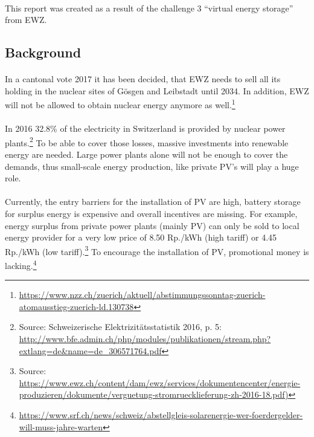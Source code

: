 \documentclass{scrartcl}
\begin{document}
	\paragraph{}
	This report was created as a result of the challenge 3 “virtual energy storage” from EWZ.
	
	\subsection{Background}
	
	\paragraph{}
	In a cantonal vote 2017 it has been decided, that EWZ needs to sell all its holding in the nuclear sites of Gösgen and Leibstadt until 2034. In addition, EWZ will not be allowed to obtain nuclear energy anymore as well.\footnote{\url{https://www.nzz.ch/zuerich/aktuell/abstimmungssonntag-zuerich-atomausstieg-zuerich-ld.130738}}
	
	\paragraph{}
	In 2016 32.8\% of the electricity in Switzerland is provided by nuclear power plants.\footnote{Source: Schweizerische Elektrizitätsstatistik 2016, p. 5: \url{http://www.bfe.admin.ch/php/modules/publikationen/stream.php?extlang=de\&name=de_306571764.pdf}} To be able to cover those losses, massive investments into renewable energy are needed. Large power plants alone will not be enough to cover the demands, thus small-scale energy production, like private PV's will play a huge role.
	
	\paragraph{}
	Currently, the entry barriers for the installation of PV are high, battery storage for surplus energy is expensive and overall incentives are missing. For example, energy surplus from private power plants (mainly PV) can only be sold to local energy provider for a very low price of 8.50 Rp./kWh (high tariff) or 4.45 Rp./kWh (low tariff).\footnote{Source: \url{https://www.ewz.ch/content/dam/ewz/services/dokumentencenter/energie-produzieren/dokumente/verguetung-stromruecklieferung-zh-2016-18.pdf)}} To encourage the installation of PV, promotional money is lacking.\footnote{\url{https://www.srf.ch/news/schweiz/abstellgleis-solarenergie-wer-foerdergelder-will-muss-jahre-warten}}
\end{document}
